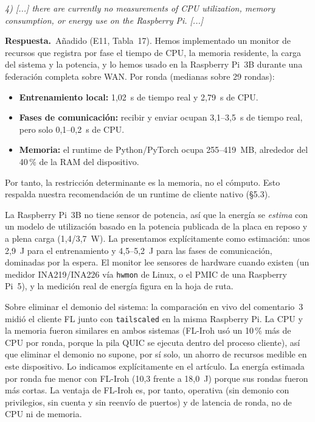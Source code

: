 \documentclass[11pt,a4paper]{article}
\newenvironment{comment}{\par\medskip\noindent\begin{minipage}{\linewidth}\color{blue!45!black}\itshape}{\end{minipage}\par}
\newcommand{\reply}{\par\smallskip\noindent\textbf{Respuesta.}~}
\begin{document}
\begin{comment}
4) [...] there are currently no measurements of CPU utilization, memory consumption, or energy use on the Raspberry Pi. [...]
\end{comment}
\reply Añadido (E11, Tabla~17). Hemos implementado un monitor de recursos que registra por fase el tiempo de CPU, la memoria residente, la carga del sistema y la potencia, y lo hemos usado en la Raspberry Pi~3B durante una federación completa sobre WAN. Por ronda (medianas sobre 29 rondas):
\begin{itemize}[leftmargin=1.3em,itemsep=0.1em]
\item \textbf{Entrenamiento local:} 1,02~s de tiempo real y 2,79~s de CPU.
\item \textbf{Fases de comunicación:} recibir y enviar ocupan 3,1--3,5~s de tiempo real, pero solo 0,1--0,2~s de CPU.
\item \textbf{Memoria:} el runtime de Python/PyTorch ocupa 255--419~MB, alrededor del 40\,\% de la RAM del dispositivo.
\end{itemize}
Por tanto, la restricción determinante es la memoria, no el cómputo. Esto respalda nuestra recomendación de un runtime de cliente nativo (\S5.3).

La Raspberry Pi~3B no tiene sensor de potencia, así que la energía se \emph{estima} con un modelo de utilización basado en la potencia publicada de la placa en reposo y a plena carga (1,4/3,7~W). La presentamos explícitamente como estimación: unos 2,9~J para el entrenamiento y 4,5--5,2~J para las fases de comunicación, dominadas por la espera. El monitor lee sensores de hardware cuando existen (un medidor INA219/INA226 vía \texttt{hwmon} de Linux, o el PMIC de una Raspberry Pi~5), y la medición real de energía figura en la hoja de ruta.

Sobre eliminar el demonio del sistema: la comparación en vivo del comentario~3 midió el cliente FL junto con \texttt{tailscaled} en la misma Raspberry Pi. La CPU y la memoria fueron similares en ambos sistemas (FL-Iroh usó un 10\,\% más de CPU por ronda, porque la pila QUIC se ejecuta dentro del proceso cliente), así que eliminar el demonio no supone, por sí solo, un ahorro de recursos medible en este dispositivo. Lo indicamos explícitamente en el artículo. La energía estimada por ronda fue menor con FL-Iroh (10,3 frente a 18,0~J) porque sus rondas fueron más cortas. La ventaja de FL-Iroh es, por tanto, operativa (sin demonio con privilegios, sin cuenta y sin reenvío de puertos) y de latencia de ronda, no de CPU ni de memoria.
\end{document}
